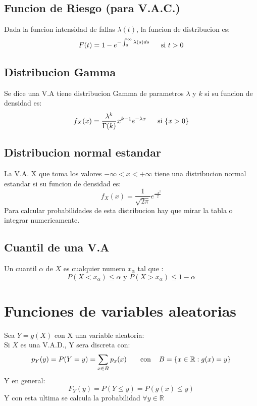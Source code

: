 \documentclass[titlepage,a4paper]{article}
\begin{document}
\subsection{Funcion de Riesgo (para V.A.C.)}
Dada la funcion intensidad de fallas $\lambda (t)$, la funcion de distribucion es:
\begin{equation*}
    F(t)= 1-e^{-\int_{0}^{\infty} \lambda(s)ds} \hspace{16px} \text{si  } t>0
\end{equation*}

\subsection{Distribucion Gamma}
Se dice una V.A tiene distribucion Gamma de parametros $\lambda$ y $k$ si su funcion de densidad es:
\begin{equation*}
    f_{X}(x)= \frac{\lambda^k}{\Gamma(k)}x^{k-1}e^{-\lambda x} \hspace{16px} \text{si  } \{x>0\}
\end{equation*}

\subsection{Distribucion normal estandar}
La V.A. X que toma los valores $-\infty < x < +\infty $ tiene una distribucion normal estandar si su funcion de densidad es:
\begin{equation*}
    f_{X}(x) = \frac{1}{\sqrt{2\pi}} e^{\frac{-x^{2}}{2}}
\end{equation*}
Para calcular probabilidades de esta distribucion hay que mirar la tabla o integrar numericamente.

\subsection{Cuantil de una V.A}

Un cuantil $\alpha$ de $X$ es cualquier numero $x_{\alpha}$ tal que :
\begin{equation*}
    P(X<x_{\alpha}) \leq \alpha \text{  y  } P(X>x_{\alpha}) \leq 1-\alpha
\end{equation*}

\section{Funciones de variables aleatorias}
Sea $ Y = g(X)$ con X una variable aleatoria:\\
Si $X$ es una V.A.D., Y sera discreta con:
\begin{equation*}
    p_{Y}(y) = P(Y=y) = \sum_{x \in B} p_{x}(x) \hspace{16px} \text{ con } \hspace{8px} B = \{ x\in \mathbb{R}: g(x)=y \}
\end{equation*}
Y en general:
\begin{equation*}
    F_{Y}(y)= P(Y \leq y) = P(g(x) \leq y)
\end{equation*}
Y con esta ultima se calcula la probabilidad $\forall y \in \mathbb{R}$
\end{document}
